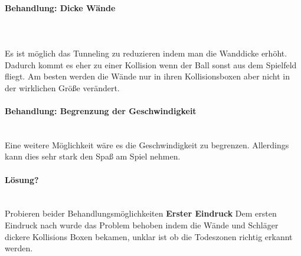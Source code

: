 \paragraph{Behandlung: Dicke Wände}\\
\mbox{}\\
Es ist möglich das Tunneling zu reduzieren indem man die Wanddicke erhöht. Dadurch kommt es eher zu einer Kollision wenn der Ball sonst aus dem Spielfeld fliegt.
\newline
Am besten werden die Wände nur in ihren Kollisionsboxen aber nicht in der wirklichen Größe verändert.
\paragraph{Behandlung: Begrenzung der Geschwindigkeit}
\mbox{}\\
Eine weitere Möglichkeit wäre es die Geschwindigkeit zu begrenzen. Allerdings kann dies sehr stark den Spaß am Spiel nehmen.
\paragraph{Lösung?}
\mbox{}\\
Probieren beider Behandlungsmöglichkeiten
\newline
\textbf{Erster Eindruck} Dem ersten Eindruck nach wurde das Problem behoben indem die Wände und Schläger dickere Kollisions Boxen bekamen, unklar ist ob die Todeszonen richtig erkannt werden.